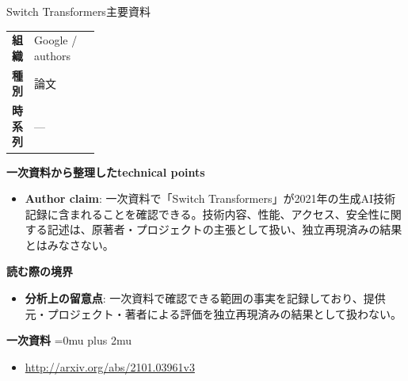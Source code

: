 \begin{technicalnote}{Switch Transformers}{主要資料}
\begingroup
\begin{tabularx}{\linewidth}{@{}>{\bfseries}p{0.22\linewidth}X@{}}
組織 & Google / authors \\
種別 & 論文 \\
時系列 & — \\
\end{tabularx}
\smallskip
{\bfseries 一次資料から整理したtechnical points}
\begin{itemize}[leftmargin=1.5em,itemsep=0.35em]
\item \textbf{Author claim}: 一次資料で「Switch Transformers」が2021年の生成AI技術記録に含まれることを確認できる。技術内容、性能、アクセス、安全性に関する記述は、原著者・プロジェクトの主張として扱い、独立再現済みの結果とはみなさない。
\end{itemize}
\begin{minipage}{\linewidth}
{\bfseries 読む際の境界}
\begin{itemize}[leftmargin=1.5em,itemsep=0.35em]
\item \textbf{分析上の留意点}: 一次資料で確認できる範囲の事実を記録しており、提供元・プロジェクト・著者による評価を独立再現済みの結果として扱わない。
\end{itemize}
\begin{samepage}
{\bfseries 一次資料}
\begingroup\sloppy
\Urlmuskip=0mu plus 2mu\relax
\begin{itemize}[leftmargin=1.5em,itemsep=0.25em]
\item {\scriptsize\url{http://arxiv.org/abs/2101.03961v3}}
\end{itemize}
\endgroup
\end{samepage}
\end{minipage}
\endgroup
\end{technicalnote}
\medskip

